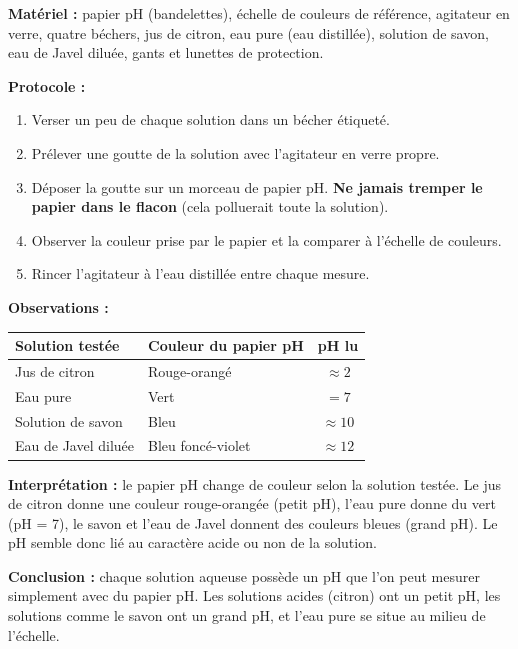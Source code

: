 \documentclass[11pt]{article}
\begin{document}
\begin{experience}
\textbf{Matériel :} papier pH (bandelettes), échelle de couleurs de référence, agitateur en verre, quatre béchers, jus de citron, eau pure (eau distillée), solution de savon, eau de Javel diluée, gants et lunettes de protection.

\textbf{Protocole :}
\begin{enumerate}
\item Verser un peu de chaque solution dans un bécher étiqueté.
\item Prélever une goutte de la solution avec l'agitateur en verre propre.
\item Déposer la goutte sur un morceau de papier pH. \textbf{Ne jamais tremper le papier dans le flacon} (cela polluerait toute la solution).
\item Observer la couleur prise par le papier et la comparer à l'échelle de couleurs.
\item Rincer l'agitateur à l'eau distillée entre chaque mesure.
\end{enumerate}

\textbf{Observations :}
\begin{center}
\begin{tabularx}{\linewidth}{|l|X|c|}\hline
\rowcolor{popblueL} \textbf{Solution testée} & \textbf{Couleur du papier pH} & \textbf{pH lu} \\ \hline
Jus de citron & Rouge-orangé & $\approx 2$ \\ \hline
Eau pure & Vert & $= 7$ \\ \hline
Solution de savon & Bleu & $\approx 10$ \\ \hline
Eau de Javel diluée & Bleu foncé-violet & $\approx 12$ \\ \hline
\end{tabularx}
\end{center}

\textbf{Interprétation :} le papier pH change de couleur selon la solution testée. Le jus de citron donne une couleur rouge-orangée (petit pH), l'eau pure donne du vert (pH = 7), le savon et l'eau de Javel donnent des couleurs bleues (grand pH). Le pH semble donc lié au caractère acide ou non de la solution.

\textbf{Conclusion :} chaque solution aqueuse possède un pH que l'on peut mesurer simplement avec du papier pH. Les solutions acides (citron) ont un petit pH, les solutions comme le savon ont un grand pH, et l'eau pure se situe au milieu de l'échelle.
\end{experience}
\end{document}
